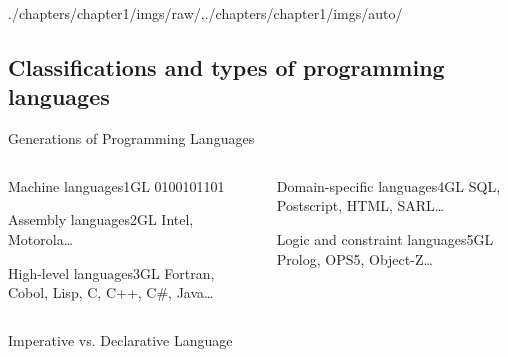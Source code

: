\begin{graphicspathcontext}{{./chapters/chapter1/imgs/raw/},{./chapters/chapter1/imgs/auto/}}
\begin{bibunit}[apalike]


\subsection{Classifications and types of programming languages}

\begin{frame}{Generations of Programming Languages}
	\begin{columns}
		\begin{column}{.5\linewidth}
			\begin{rightanchorblock}{Machine languages}{1GL}
				0100101101
			\end{rightanchorblock}
			\vspace{0.5cm}
			\begin{rightanchorblock}{Assembly languages}{2GL}
				Intel, Motorola\dots
			\end{rightanchorblock}
			\vspace{0.5cm}
			\begin{rightanchorblock}{High-level languages}{3GL}
				Fortran, Cobol, Lisp, C, C++, C\#, Java\dots
			\end{rightanchorblock}
		\end{column}
		\begin{column}{.5\linewidth}
			\begin{leftanchorblock}{Domain-specific languages}{4GL}
				SQL, Postscript, HTML, SARL\dots
			\end{leftanchorblock}
			\vspace{0.5cm}
			\begin{leftanchorblock}{Logic and constraint languages}{5GL}
				Prolog, OPS5, Object-Z\dots
			\end{leftanchorblock}
		\end{column}
	\end{columns}
\end{frame}

\begin{frame}{Imperative vs. Declarative Language}
	\hfill
\end{frame}


\end{bibunit}
\end{graphicspathcontext}
